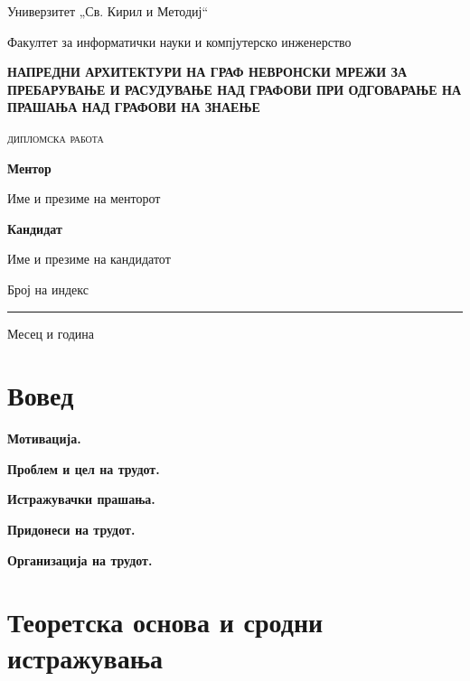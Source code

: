 \documentclass[14pt]{extarticle}
\date{}
\newcommand{\UniversityName}
    {Универзитет „Св. Кирил и Методиј“}
\newcommand{\FacultyName}
    {Факултет за информатички науки и компјутерско инженерство}
\newcommand{\ProjectType}
    {дипломска работа}
\newcommand{\ProjectTitle}
    {Напредни архитектури на граф невронски мрежи за пребарување и расудување над графови при одговарање на прашања над графови на знаење}
\newcommand{\ProjectMentor}
    {Име и презиме на менторот}
\newcommand{\ProjectCandidate}
    {Име и презиме на кандидатот}
\newcommand{\ProjectCandidateIndex}
    {Број на индекс}
\newcommand{\ProjectDate}
    {Месец и година}
\begin{document}
\begin{titlepage}
    \begin{center}
        {\Large \UniversityName}\par
        \vspace{0.5cm}
        {\Large \FacultyName}\par

        \vspace*{\fill}

        {\Large\textbf{\MakeUppercase{\ProjectTitle}}}\par
        \vspace{1cm}
        {\large\textsc{\ProjectType}}\par

        \vspace*{\fill}

        \begin{minipage}[t]{0.49\textwidth}
            \large\textbf{Ментор}\par
            \ProjectMentor
        \end{minipage}
        \hfill
        \begin{minipage}[t]{0.45\textwidth}
            \raggedleft
            \large\textbf{Кандидат}\par
            \ProjectCandidate\par
            \ProjectCandidateIndex
        \end{minipage}

        \vspace{1cm}
        \rule{\textwidth}{0.5mm}
        {\large \ProjectDate}
    \end{center}
\end{titlepage}

\tableofcontents
\newpage

\listoftables
\listoffigures
\newpage

\section{Вовед}

\textbf{Мотивација.}

\textbf{Проблем и цел на трудот.}

\textbf{Истражувачки прашања.}

\textbf{Придонеси на трудот.}

\textbf{Организација на трудот.}

\section{Теоретска основа и сродни истражувања}
\end{document}
